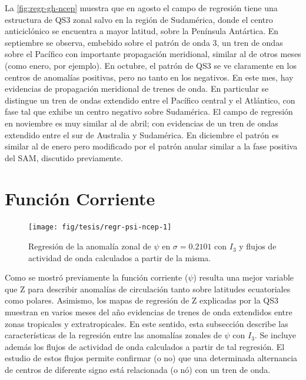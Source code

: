 \documentclass[spanish,a4paper,12pt,oneside]{book}
\begin{document}
La \autoref{fig:regr-gh-ncep} muestra que en agosto el campo de
regresión tiene una estructura de QS3 zonal salvo en la región de
Sudamérica, donde el centro anticiclónico se encuentra a mayor latitud,
sobre la Península Antártica. En septiembre se observa, embebido sobre
el patrón de onda 3, un tren de ondas sobre el Pacífico con importante
propagación meridional, similar al de otros meses (como enero, por
ejemplo). En octubre, el patrón de QS3 se ve claramente en los centros
de anomalías positivas, pero no tanto en los negativos. En este mes, hay
evidencias de propagación meridional de trenes de onda. En particular se
distingue un tren de ondas extendido entre el Pacífico central y el
Atlántico, con fase tal que exhibe un centro negativo sobre Sudamérica.
El campo de regresión en noviembre es muy similar al de abril; con
evidencias de un tren de ondas extendido entre el sur de Australia y
Sudamérica. En diciembre el patrón es similar al de enero pero
modificado por el patrón anular similar a la fase positiva del SAM,
discutido previamente.

\section*{Función Corriente}

\begin{landscape}\begin{figure}

{\centering \texttt{[image: fig/tesis/regr-psi-ncep-1]} 

}

\caption{Regresión de la anomalía zonal de $\psi$ en $\sigma = 0.2101$ con $I_3$ y flujos de actividad de onda calculados a partir de la misma.}\label{fig:regr-psi-ncep}
\end{figure}
\end{landscape}

Como se mostró previamente la función corriente (\(\psi\)) resulta una
mejor variable que Z para describir anomalías de circulación tanto sobre
latitudes ecuatoriales como polares. Asimismo, los mapas de regresión de
Z explicadas por la QS3 muestran en varios meses del año evidencias de
trenes de onda extendidos entre zonas tropicales y extratropicales. En
este sentido, esta subsección describe las características de la
regresión entre las anomalías zonales de \(\psi\) con \(I_3\). Se
incluye además los flujos de actividad de onda calculados a partir de
tal regresión. El estudio de estos flujos permite confirmar (o no) que
una determinada alternancia de centros de diferente signo está
relacionada (o nó) con un tren de onda.
\end{document}
